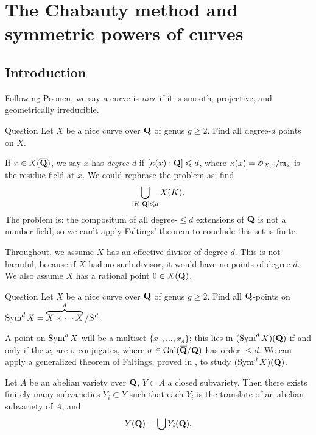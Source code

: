 
\section{The Chabauty method and symmetric powers of curves}\label{sec:park}





\subsection{Introduction}

Following Poonen, we say a curve is \emph{nice} if it is smooth, projective, 
and geometrically irreducible. 

\begin{enonce}{Question}
Let $X$ be a nice curve over $\mathbf{Q}$ of genus $g\geqslant 2$. Find all degree-$d$ 
points on $X$. 
\end{enonce}

If $x\in X(\overline{\mathbf{Q}})$, we say $x$ has \emph{degree $d$} if 
$[\kappa(x):\mathbf{Q}]\leqslant d$, where $\kappa(x)=\mathscr{O}_{X,x}/\mathfrak{m}_x$ is the residue 
field at $x$. We could rephrase the problem as: find 
\[
  \bigcup_{[K:\mathbf{Q}]\leqslant d} X(K) .
\]
The problem is: the compositum of all degree-$\leqslant d$ extensions of $\mathbf{Q}$ 
is not a number field, so we can't apply Faltings' theorem to conclude this set 
is finite. 

Throughout, we assume $X$ has an effective divisor of degree $d$. This is not 
harmful, because if $X$ had no such divisor, it would have no points of degree 
$d$. We also assume $X$ has a rational point $0\in X(\mathbf{Q})$. 

\begin{enonce}{Question}
Let $X$ be a nice curve over $\mathbf{Q}$ of genus $g\geqslant 2$. Find all 
$\mathbf{Q}$-points on $\operatorname{Sym}^d X = \overbrace{X\times \cdots X}^d / S^d$. 
\end{enonce}

A point on $\operatorname{Sym}^d X$ will be a multiset $\{x_1,\dots,x_d\}$; this lies 
in $(\operatorname{Sym}^d X)(\mathbf{Q})$ if and only if the $x_i$ are $\sigma$-conjugates, 
where $\sigma\in \operatorname{Gal}(\overline{\mathbf{Q}}/\mathbf{Q})$ has order $\leqslant d$. We can 
apply a generalized theorem of Faltings, proved in \cite{f94}, to study 
$(\operatorname{Sym}^d X)(\mathbf{Q})$. 

\begin{theo}[Faltings]
Let $A$ be an abelian variety over $\mathbf{Q}$, $Y\subset A$ a closed subvariety. Then 
there exists finitely many subvarieties $Y_i\subset Y$ such that each $Y_i$ is 
the translate of an abelian subvariety of $A$, and 
\[
  Y(\mathbf{Q}) = \bigcup Y_i(\mathbf{Q}) .
\]
\end{theo}

